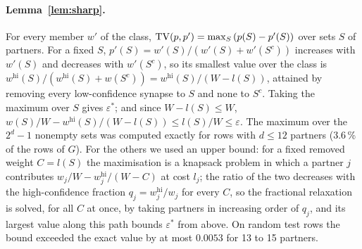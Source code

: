 \paragraph{Lemma~\ref{lem:sharp}.}
For every member $w'$ of the class, $\operatorname{TV}(p,p')=\max_S\,(p(S)-p'(S))$ over sets $S$ of partners. For a
fixed $S$, $p'(S)=w'(S)/(w'(S)+w'(S^c))$ increases with $w'(S)$ and decreases with $w'(S^c)$, so its
smallest value over the class is $w^{\mathrm{hi}}(S)/(w^{\mathrm{hi}}(S)+w(S^c))
=w^{\mathrm{hi}}(S)/(W-l(S))$, attained by removing every low-confidence synapse to $S$ and none to
$S^c$. Taking the maximum over $S$ gives $\varepsilon^*$; and since $W-l(S)\le W$,
$w(S)/W-w^{\mathrm{hi}}(S)/(W-l(S))\le l(S)/W\le\varepsilon$. The maximum over the $2^d-1$ nonempty
sets was computed exactly for rows with $d\le12$ partners (3.6\,\% of the rows of $G$). For the
others we used an upper bound: for a fixed removed weight $C=l(S)$ the maximisation is a knapsack
problem in which a partner $j$ contributes $w_j/W-w^{\mathrm{hi}}_j/(W-C)$ at cost $l_j$; the ratio
of the two decreases with the high-confidence fraction $q_j=w^{\mathrm{hi}}_j/w_j$ for every $C$, so
the fractional relaxation is solved, for all $C$ at once, by taking partners in increasing order of
$q_j$, and its largest value along this path bounds $\varepsilon^*$ from above. On random test rows
the bound exceeded the exact value by at most $0.0053$ for 13 to 15 partners.

